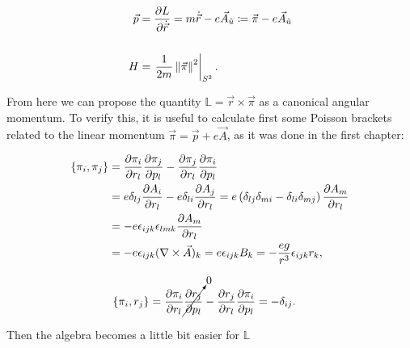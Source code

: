 \begin{equation*}
\begin{aligned}
\vec{p} &= \frac{\partial L}{\partial \dot{\vec{r}}} = m\dot{\vec{r}}-e\vec{A}_{\hat{u}} \coloneqq \vec{\pi}-e\vec{A}_{\hat{u}} \\
\\
H &= \left.\frac{1}{2m}\left\lVert \vec{\pi} \right\rVert^2\right|_{S^2}.
\end{aligned}
\end{equation*}

From here we can propose the quantity $\mathbb{L}= \vec{r}\times\vec{\pi}$ as a canonical angular momentum. To verify this, it is useful to calculate first some Poisson brackets related to the linear momentum $\vec{\pi} = \vec{p} + e\vec{A}$, as it was done in the first chapter:


\begin{align*}
\left\lbrace \pi_i, \pi_j \right\rbrace &= \frac{\partial \pi_i}{\partial r_l}\frac{\partial \pi_j}{\partial p_l} - \frac{\partial \pi_j}{\partial r_l}\frac{\partial \pi_i}{\partial p_l}\\
&= e\delta_{lj}\frac{\partial A_i}{\partial r_l} -e\delta_{li}\frac{\partial A_j}{\partial r_l}            = e\left( \delta_{lj}\delta_{mi} - \delta_{li}\delta_{mj} \right)\frac{\partial A_m}{\partial r_l} \\
&= -e\epsilon_{ijk}\epsilon_{lmk}\frac{\partial A_m}{\partial r_l}\\
&= -e\epsilon_{ijk}(\nabla \times \vec{A})_k = e\epsilon_{ijk}B_k = -\frac{eg}{r^3}\epsilon_{ijk}r_k,
\end{align*}

\begin{align*}
\left\lbrace \pi_i, r_j \right\rbrace &= \frac{\partial \pi_i}{\partial r_l}\cancelto{0}{\frac{\partial r_j}{\partial p_l}} - \frac{\partial r_j}{\partial r_l}\frac{\partial \pi_i}{\partial p_l} =  -\delta_{ij}.
\end{align*}

Then the algebra becomes a little bit easier for $\mathbb{L}$

